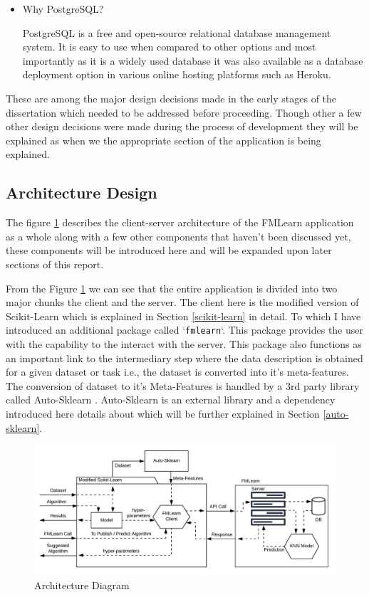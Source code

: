 \begin{itemize}
    \item Why PostgreSQL?
    
    PostgreSQL is a free and open-source relational database management system. It is easy to use when compared to other options and most importantly as it is a widely used database it was also available as a database deployment option in various online hosting platforms such as Heroku.
    
\end{itemize}

These are among the major design decisions made in the early stages of the dissertation which needed to be addressed before proceeding. Though other a few other design decisions were made during the process of development they will be explained as when we the appropriate section of the application is being explained.

\subsection{Architecture Design}
\label{architecture}

The figure \ref{architecture-diagram} describes the client-server architecture of the FMLearn application as a whole along with a few other components that haven't been discussed yet, these components will be introduced here and will be expanded upon later sections of this report. 

From the Figure \ref{architecture-diagram} we can see that the entire application is divided into two major chunks the client and the server. The client here is the modified version of Scikit-Learn which is explained in Section \ref{scikit-learn} in detail. To which I have introduced an additional package called `\texttt{fmlearn}`. This package provides the user with the capability to the interact with the server. This package also functions as an important link to the intermediary step where the data description is obtained for a given dataset or task i.e., the dataset is converted into it's meta-features. The conversion of dataset to it's Meta-Features is handled by a 3rd party library called Auto-Sklearn \citep{feurer:m}. Auto-Sklearn is an external library and a dependency introduced here details about which will be further explained in Section \ref{auto-sklearn}.

\begin{figure}[t]
    \centering
    \includegraphics[width=15cm]{images/FML Architecture Diagram.jpeg}
    \caption{Architecture Diagram}
    \label{architecture-diagram}
\end{figure}


